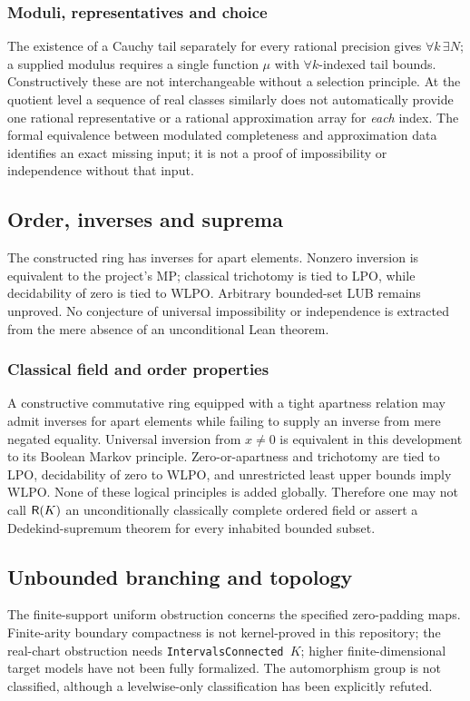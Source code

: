 \documentclass[11pt,reqno]{amsart}
\theoremstyle{definition}\newtheorem{definition}[theorem]{Definition}
\theoremstyle{remark}\newtheorem{remark}[theorem]{Remark}
\begin{document}
\subsubsection*{Moduli, representatives and choice}\label{supp:16-2}
The existence of a Cauchy tail separately for every rational precision gives $\forall k\,\exists N$; a supplied modulus requires a single function $\mu$ with $\forall k$-indexed tail bounds. Constructively these are not interchangeable without a selection principle. At the quotient level a sequence of real classes similarly does not automatically provide one rational representative or a rational approximation array for \emph{each} index. The formal equivalence between modulated completeness and approximation data identifies an exact missing input; it is not a proof of impossibility or independence without that input.
\medskip

\subsection{Order, inverses and suprema}\label{main:sub-62}
The constructed ring has inverses for apart elements. Nonzero inversion is equivalent to the project's MP; classical trichotomy is tied to LPO, while decidability of zero is tied to WLPO. Arbitrary bounded-set LUB remains unproved. No conjecture of universal impossibility or independence is extracted from the mere absence of an unconditional Lean theorem.

\medskip
\subsubsection*{Classical field and order properties}\label{supp:16-3}
A constructive commutative ring equipped with a tight apartness relation may admit inverses for apart elements while failing to supply an inverse from mere negated equality. Universal inversion from $x\ne0$ is equivalent in this development to its Boolean Markov principle. Zero-or-apartness and trichotomy are tied to LPO, decidability of zero to WLPO, and unrestricted least upper bounds imply WLPO. None of these logical principles is added globally. Therefore one may not call $\mathsf R(K)$ an unconditionally classically complete ordered field or assert a Dedekind-supremum theorem for every inhabited bounded subset.
\medskip

\subsection{Unbounded branching and topology}\label{main:sub-63}
The finite-support uniform obstruction concerns the specified zero-padding maps. Finite-arity boundary compactness is not kernel-proved in this repository; the real-chart obstruction needs \texttt{IntervalsConnected $K$}; higher finite-dimensional target models have not been fully formalized. The automorphism group is not classified, although a levelwise-only classification has been explicitly refuted.
\end{document}
